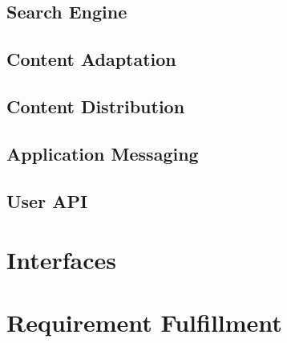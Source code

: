 \subsection{Search Engine\label{sec:des_se_en}}
\subsection{Content Adaptation\label{sec:des_ar_ov}}
\subsection{Content Distribution\label{sec:des_cdn}}	
	
	\subsection{Application Messaging\label{sec:des_me}}
	
	\subsection{User API\label{sec:des_api}}

\section{Interfaces\label{sec:des_inter}}

\section{Requirement Fulfillment\label{sec:des_inter}}